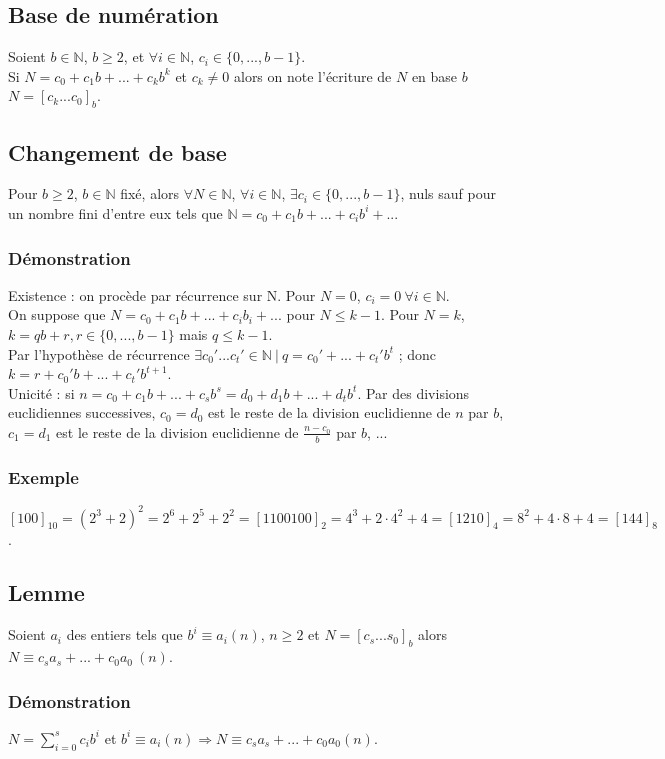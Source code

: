 \documentclass[a4paper,10pt]{book} %
\newcommand{\N}{\mathbb{N}}
\newcommand{\tq}{~|~}
\begin{document}
\subsection{Base de numération}
Soient $b\in \N$, $b\geq 2$, et $\forall i\in \N$, $c_i \in\{0,...,b-1 \}$. \\
Si $N=c_0+c_1b+...+c_kb^k$ et $c_k\neq 0$ alors on note l'écriture de $N$ en base $b$ $N=[c_k...c_0]_b$.

\subsection{Changement de base}
Pour $b\geq 2$, $b\in\N$ fixé, alors $\forall N\in \N$, $\forall i\in \N$, $\exists c_i\in \{0,...,b-1 \}$, nuls sauf pour un nombre fini d'entre eux tels que $\N=c_0+c_1b+...+c_ib^i+...$

\subsubsection{Démonstration}
Existence : on procède par récurrence sur N. Pour $N=0$, $c_i=0~\forall i\in\N$.\\
On suppose que $N=c_0+c_1b+...+c_ib_i+...$ pour $N\leq k-1$. Pour $N=k$, $k=qb+r, r\in\{0,...,b-1\}$ mais $q\leq k-1$.\\
Par l'hypothèse de récurrence $\exists c_0'...c_t'\in\N \tq q=c_0'+...+c_t'b^t$ ; donc $k=r+c_0'b+...+c_t'b^{t+1}$.\\

Unicité : si $n=c_0+c_1b+...+c_sb^s=d_0+d_1b+...+d_tb^t$.
Par des divisions euclidiennes successives, $c_0=d_0$ est le reste de la division euclidienne de $n$ par $b$, $c_1=d_1$ est le reste de la division euclidienne de $\frac{n-c_0}{b}$ par $b$, ...

\subsubsection{Exemple}
$[100]_{10}=(2^3+2)^2=2^6+2^5+2^2=[1100100]_2=4^3+2\cdot 4^2+4=[1210]_4=8^2+4\cdot 8+4=[144]_8$.

\subsection{Lemme}
Soient $a_i$ des entiers tels que $b^i\equiv a_i(n)$, $n\geq 2$ et $N=[c_s...s_0]_b$ alors $N\equiv c_sa_s+...+c_0a_0~(n)$.

\subsubsection{Démonstration}
$N=\sum\limits_{i=0}^{s}c_ib^i$ et $b^i\equiv a_i(n) \Rightarrow N\equiv c_sa_s+...+c_0a_0(n)$.
\end{document}
